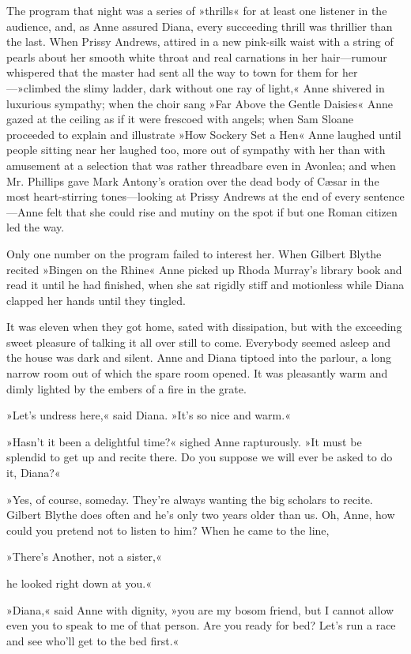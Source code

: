 The program that night was a series of »thrills« for at least one listener in the audience, and, as Anne assured Diana, every succeeding thrill was thrillier than the last. When Prissy Andrews, attired in a new pink-silk waist with a string of pearls about her smooth white throat and real carnations in her hair—rumour whispered that the master had sent all the way to town for them for her—»climbed the slimy ladder, dark without one ray of light,« Anne shivered in luxurious sympathy; when the choir sang »Far Above the Gentle Daisies« Anne gazed at the ceiling as if it were frescoed with angels; when Sam Sloane proceeded to explain and illustrate »How Sockery Set a Hen« Anne laughed until people sitting near her laughed too, more out of sympathy with her than with amusement at a selection that was rather threadbare even in Avonlea; and when Mr. Phillips gave Mark Antony’s oration over the dead body of Cæsar in the most heart-stirring tones—looking at Prissy Andrews at the end of every sentence—Anne felt that she could rise and mutiny on the spot if but one Roman citizen led the way.

Only one number on the program failed to interest her. When Gilbert Blythe recited »Bingen on the Rhine« Anne picked up Rhoda Murray’s library book and read it until he had finished, when she sat rigidly stiff and motionless while Diana clapped her hands until they tingled.

It was eleven when they got home, sated with dissipation, but with the exceeding sweet pleasure of talking it all over still to come. Everybody seemed asleep and the house was dark and silent. Anne and Diana tiptoed into the parlour, a long narrow room out of which the spare room opened. It was pleasantly warm and dimly lighted by the embers of a fire in the grate.

»Let’s undress here,« said Diana. »It’s so nice and warm.«

»Hasn’t it been a delightful time?« sighed Anne rapturously. »It must be splendid to get up and recite there. Do you suppose we will ever be asked to do it, Diana?«

»Yes, of course, someday. They’re always wanting the big scholars to recite. Gilbert Blythe does often and he’s only two years older than us. Oh, Anne, how could you pretend not to listen to him? When he came to the line,

»There's Another, not a sister,«

he looked right down at you.«

»Diana,« said Anne with dignity, »you are my bosom friend, but I cannot allow even you to speak to me of that person. Are you ready for bed? Let’s run a race and see who’ll get to the bed first.«

